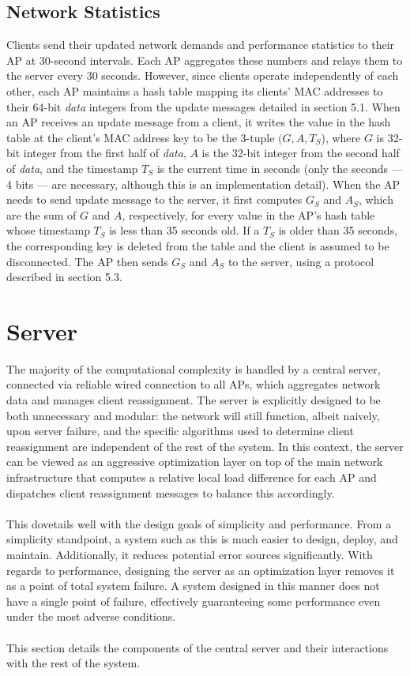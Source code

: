 \documentclass[10pt,journal,compsoc]{IEEEtran}
\begin{document}
		\subsection{Network Statistics}
		Clients send their updated network demands and performance statistics to their AP at 30-second intervals. Each AP aggregates these numbers and relays them to the server every 30 seconds. However, since clients operate independently of each other, each AP maintains a hash table mapping its clients' MAC addresses to their 64-bit \textit{data} integers from the update messages detailed in section 5.1. When an AP receives an update message from a client, it writes the value in the hash table at the client's MAC address key to be the 3-tuple \((G, A, T_S\)), where \(G\) is 32-bit integer from the first half of \textit{data}, \(A\) is the 32-bit integer from the second half of \textit{data}, and the timestamp \(T_S\) is the current time in seconds (only the seconds --- 4 bits --- are necessary, although this is an implementation detail). When the AP needs to send  update message to the server, it first computes \(G_S\) and \(A_S\), which are the sum of \(G\) and \(A\), respectively, for every value in the AP's hash table whose timestamp \(T_S\) is less than 35 seconds old. If a \(T_S\) is older than 35 seconds, the corresponding key is deleted from the table and the client is assumed to be disconnected. The AP then sends \(G_S\) and \(A_S\) to the server, using a protocol described in section 5.3.
		
		\section{Server}
		The majority of the computational complexity is handled by a central server, connected via reliable wired connection to all APs, which aggregates network data and manages client reassignment. The server is explicitly designed to be both unnecessary and modular: the network will still function, albeit naively, upon server failure, and the specific algorithms used to determine client reassignment are independent of the rest of the system. In this context, the server can be viewed as an aggressive optimization layer on top of the main network infrastructure that computes a relative local load difference for each AP and dispatches client reassignment messages to balance this accordingly. \\
		\\
		This dovetails well with the design goals of simplicity and performance. From a simplicity standpoint, a system such as this is much easier to design, deploy, and maintain. Additionally, it reduces potential error sources significantly. With regards to performance, designing the server as an optimization layer removes it as a point of total system failure. A system designed in this manner does not have a single point of failure, effectively guaranteeing some performance even under the most adverse conditions.\\
		\\
		This section details the components of the central server and their interactions with the rest of the system.
		
\end{document}

